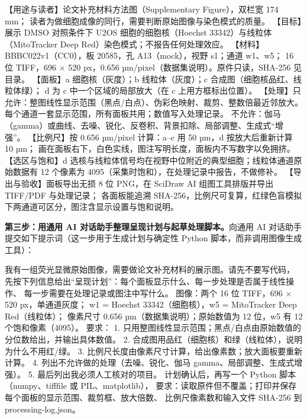 \begin{Prompt}
【用途与读者】论文补充材料方法图（Supplementary Figure），双栏宽 174 mm；
读者为做细胞成像的同行，需要判断原始图像与染色模式的质量。
【目标】展示 DMSO 对照条件下 U2OS 细胞的细胞核（Hoechst 33342）与线粒体
（MitoTracker Deep Red）染色模式；不报告任何处理效应。
【材料】BBBC022v1（CC0），板 20585，孔 A13（mock），视野 s1；通道 w1、w5；
16 位 TIFF，696 × 520 px，0.656 µm/pixel（数据集说明）。原件只读，SHA-256 见目录。
【面板】a 细胞核（灰度）；b 线粒体（灰度）；c 合成图（细胞核品红、线粒体绿）；
d 为 c 中一个区域的局部放大（在 c 上用方框标出位置）。
【处理】只允许：整图线性显示范围（黑点/白点）、伪彩色映射、裁剪、整数倍最近邻放大。
每个通道一套显示范围，所有面板共用；数值写入处理记录。
不允许：伽马（gamma）或曲线、去噪、锐化、反卷积、背景扣除、局部调整、生成式“增强”。
【比例尺】按 0.656 µm/pixel 计算：a–c 用 50 µm，d 按放大后重新计算 10 µm；
画在面板右下，白色实线，图注写明长度，面板内不写数字以免拥挤。
【选区与饱和】d 选核与线粒体信号均在视野中位附近的典型细胞；线粒体通道原始数据有
12 个像素为 4095（采集时饱和），在处理记录中报告，不做修补。
【导出与验收】面板导出无损 8 位 PNG，在 SciDraw AI 组图工具排版并导出 TIFF/PDF 与处理记录；
各面板能追溯 SHA-256，比例尺可复算，红绿色盲模拟下两通道可区分，图注含显示设置与饱和说明。
\end{Prompt}

\textbf{第三步：用通用 AI 对话助手整理呈现计划与起草处理脚本。}向通用 AI 对话助手提交如下提示词（这一步用于生成计划与确定性 Python 脚本，而非调用图像生成工具）：

\begin{Prompt}
我有一组荧光显微原始图像，需要做论文补充材料的展示图。请先不要写代码，
先按下列信息给出“呈现计划”：每个面板显示什么、每一步处理是否属于线性操作、
每一步需要在处理记录或图注中写什么。
图像：两个 16 位 TIFF，696 × 520 px，单通道灰度；
w1 = Hoechst 33342（细胞核），w5 = MitoTracker Deep Red（线粒体）；
像素尺寸 0.656 µm（数据集说明）；原始数值为 12 位，w5 有 12 个饱和像素（4095）。
要求：
1. 只用整图线性显示范围；黑点/白点由原始数值的分位数给出，并输出具体数值。
2. 合成图用品红（细胞核）和绿（线粒体），说明为什么不用红/绿。
3. 比例尺长度由像素尺寸计算，给出像素数；放大面板要重新计算。
4. 列出不允许做的处理（去噪、锐化、伽马 gamma、局部调整、生成式增强）。
5. 最后列出我必须人工核对的项目。
计划确认后，再写一个 Python 脚本（numpy、tifffile 或 PIL、matplotlib），
要求：读取原件但不覆盖；打印并保存每个面板的显示范围、裁剪框、放大倍数、
比例尺像素数和输入文件 SHA-256 到 processing-log.json。
\end{Prompt}

